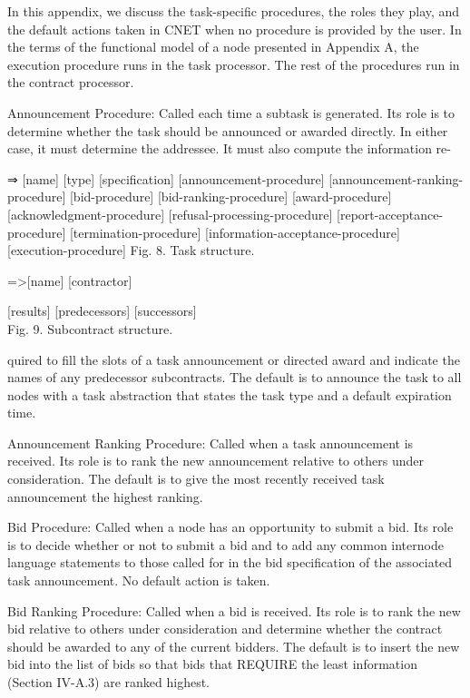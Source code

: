 \documentclass[
]{article}
\begin{document}
In this appendix, we discuss the task-specific procedures, the roles
they play, and the default actions taken in CNET when no procedure is
provided by the user. In the terms of the functional model of a node
presented in Appendix A, the execution procedure runs in the task
processor. The rest of the procedures run in the contract processor.

Announcement Procedure: Called each time a subtask is generated. Its
role is to determine whether the task should be announced or awarded
directly. In either case, it must determine the addressee. It must also
compute the information re-

⇒ {[}name{]} {[}type{]} {[}specification{]} {[}announcement-procedure{]}
{[}announcement-ranking-procedure{]} {[}bid-procedure{]}
{[}bid-ranking-procedure{]} {[}award-procedure{]}
{[}acknowledgment-procedure{]} {[}refusal-processing-procedure{]}
{[}report-acceptance-procedure{]} {[}termination-procedure{]}
{[}information-acceptance-procedure{]} {[}execution-procedure{]} Fig. 8.
Task structure.

=\textgreater{[}name{]} {[}contractor{]}

{[}results{]} {[}predecessors{]} {[}successors{]}\\
Fig. 9. Subcontract structure.

quired to fill the slots of a task announcement or directed award and
indicate the names of any predecessor subcontracts. The default is to
announce the task to all nodes with a task abstraction that states the
task type and a default expiration time.

Announcement Ranking Procedure: Called when a task announcement is
received. Its role is to rank the new announcement relative to others
under consideration. The default is to give the most recently received
task announcement the highest ranking.

Bid Procedure: Called when a node has an opportunity to submit a bid.
Its role is to decide whether or not to submit a bid and to add any
common internode language statements to those called for in the bid
specification of the associated task announcement. No default action is
taken.

Bid Ranking Procedure: Called when a bid is received. Its role is to
rank the new bid relative to others under consideration and determine
whether the contract should be awarded to any of the current bidders.
The default is to insert the new bid into the list of bids so that bids
that REQUIRE the least information (Section IV-A.3) are ranked highest.
\end{document}
